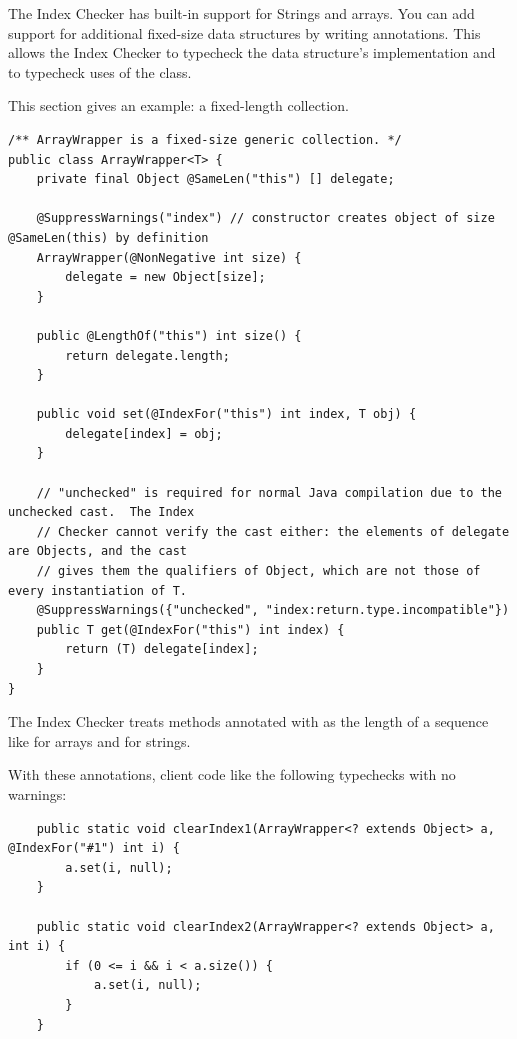 
The Index Checker has built-in support for Strings and arrays.
You can add support for additional fixed-size data structures by writing
annotations.
This allows the Index Checker to typecheck the data structure's
implementation and to typecheck uses of the class.

This section gives an example:  a fixed-length collection.


\begin{Verbatim}
/** ArrayWrapper is a fixed-size generic collection. */
public class ArrayWrapper<T> {
    private final Object @SameLen("this") [] delegate;

    @SuppressWarnings("index") // constructor creates object of size @SameLen(this) by definition
    ArrayWrapper(@NonNegative int size) {
        delegate = new Object[size];
    }

    public @LengthOf("this") int size() {
        return delegate.length;
    }

    public void set(@IndexFor("this") int index, T obj) {
        delegate[index] = obj;
    }

    // "unchecked" is required for normal Java compilation due to the unchecked cast.  The Index
    // Checker cannot verify the cast either: the elements of delegate are Objects, and the cast
    // gives them the qualifiers of Object, which are not those of every instantiation of T.
    @SuppressWarnings({"unchecked", "index:return.type.incompatible"})
    public T get(@IndexFor("this") int index) {
        return (T) delegate[index];
    }
}
\end{Verbatim}

The Index Checker treats methods annotated with   as
the length of a sequence like  for arrays and
 for strings.

With these annotations, client code like the following typechecks with no
warnings:
\begin{Verbatim}
    public static void clearIndex1(ArrayWrapper<? extends Object> a, @IndexFor("#1") int i) {
        a.set(i, null);
    }

    public static void clearIndex2(ArrayWrapper<? extends Object> a, int i) {
        if (0 <= i && i < a.size()) {
            a.set(i, null);
        }
    }
\end{Verbatim}



